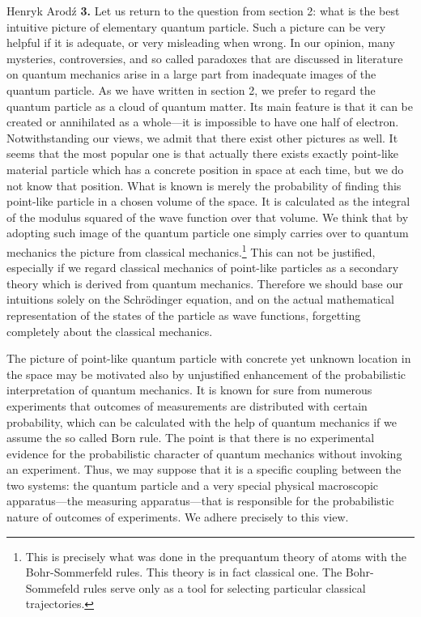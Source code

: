 \begin{artengenv}{Henryk Arod\'z}
{\bf 3.} Let us return to the question from section 2: what is the best intuitive picture of elementary quantum particle. Such a picture can be very helpful if it is adequate, or very misleading when wrong. In our opinion, many mysteries, controversies, and so called paradoxes that are discussed in literature on quantum mechanics arise in a large part from inadequate images of the quantum particle. As we have written in section 2, we prefer to regard
 the quantum particle as a cloud of quantum matter. Its main feature is that it can be created or annihilated as a whole---it is impossible to have one half of electron. Notwithstanding our views, we admit that there exist other pictures as well. It seems that the most popular one is that actually there exists exactly point-like material particle which has a concrete position in space at each time, but we do not know that position. What is known is merely the probability of finding this point-like particle in a chosen volume of the space. It is calculated as the integral of the modulus squared of the wave function over that volume. We think that by adopting such image of the quantum particle one simply carries over to quantum mechanics the picture from classical mechanics.\footnote{This is precisely what was done in the prequantum theory of atoms with the Bohr-Sommerfeld rules. This theory is in fact classical one. The Bohr-Sommefeld rules serve only as a tool for selecting particular classical trajectories.} This can not be justified, especially if we regard classical mechanics of point-like particles as a secondary theory which is derived from quantum mechanics. Therefore we should base our intuitions solely on the Schr\"odinger equation, and on the actual mathematical representation of the states of the particle as wave functions, forgetting completely about the classical mechanics. 

The picture of point-like quantum particle with concrete yet unknown location in the space may be motivated also by unjustified enhancement of the probabilistic interpretation of quantum mechanics. It is known for sure from numerous experiments that outcomes of measurements are distributed with certain probability, which can be calculated with the help of quantum mechanics if we assume the so called Born rule. The point is that there is no experimental evidence for the probabilistic character of quantum mechanics without invoking an experiment. Thus, we may suppose that it is a specific coupling between the two systems: the quantum particle and a very special physical macroscopic apparatus---the measuring apparatus---that is responsible for the probabilistic nature of outcomes of experiments. We adhere precisely to this view. 


\end{artengenv}
